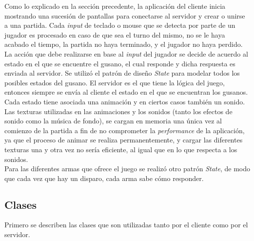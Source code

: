 Como lo explicado en la sección precedente, la aplicación del cliente inicia mostrando una sucesión de pantallas para conectarse al servidor y crear o unirse a una partida. Cada \textit{input} de teclado o mouse que se detecta por parte de un jugador es procesado en caso de que sea el turno del mismo, no se le haya acabado el tiempo, la partida no haya terminado, y el jugador no haya perdido. La acción que debe realizarse en base al \textit{input} del jugador se decide de acuerdo al estado en el que se encuentre el gusano, el cual responde y dicha respuesta es enviada al servidor. Se utilizó el patrón de diseño \textit{State} para modelar todos los posibles estados del gusano. El servidor es el que tiene la lógica del juego, entonces siempre se envía al cliente el estado en el que se encuentran los gusanos. Cada estado tiene asociada una animación y en ciertos casos también un sonido.\\
\indent Las texturas utilizadas en las animaciones y los sonidos (tanto los efectos de sonido como la música de fondo), se cargan en memoria una única vez al comienzo de la partida a fin de no comprometer la \textit{performance} de la aplicación, ya que el proceso de animar se realiza permanentemente, y cargar las diferentes texturas una y otra vez no sería eficiente, al igual que en lo que respecta a los sonidos.\\
\indent Para las diferentes armas que ofrece el juego se realizó otro patrón \textit{State}, de modo que cada vez que hay un disparo, cada arma sabe cómo responder.

\subsection{Clases}

Primero se describen las clases que son utilizadas tanto por el cliente como por el servidor.

